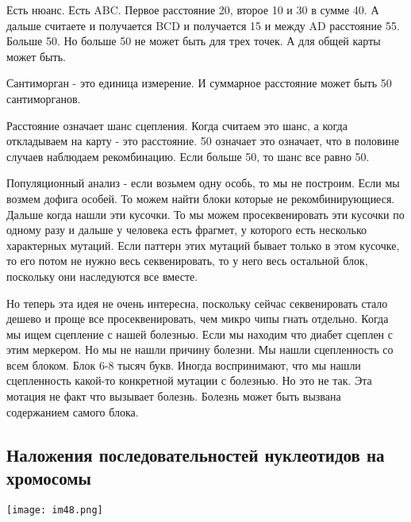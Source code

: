 \begin{description}
Есть нюанс. Есть ABC. Первое расстояние 20, второе 10 и 30 в сумме 40. А дальше считаете и 
получается BCD и получается 15 и между AD расстояние 55. Больше 50. Но больше 50 не может 
быть для трех точек. А для общей карты может быть. 

Сантиморган - это единица измерение. И суммарное расстояние может быть 50 сантиморганов. 

Расстояние означает шанс сцепления. Когда считаем это шанс, а когда откладываем на карту - это 
расстояние. 50 означает это означает, что в половине случаев наблюдаем рекомбинацию. Если больше 50, то 
шанс все равно 50. 

Популяционный анализ - если возьмем одну особь, то мы не построим. Если мы возмем дофига особей. 
То можем найти блоки которые не рекомбинирующиеся. Дальше когда нашли эти кусочки. То 
мы можем просеквенировать эти кусочки по одному разу и дальше у человека есть 
фрагмет, у которого есть несколько характерных мутаций. Если паттерн этих 
мутаций бывает только в этом кусочке, то его потом не нужно весь секвенировать, 
то у него весь остальной блок, поскольку они наследуются все вместе. 

Но теперь эта идея не очень интересна, поскольку сейчас секвенировать стало дешево и 
проще все просеквенировать, чем микро чипы гнать отдельно. Когда мы ищем сцепление с нашей болезнью. 
Если мы находим что диабет сцеплен с этим меркером. Но мы  не нашли причину болезни. 
Мы нашли сцепленность со всем блоком. Блок 6-8 тысяч букв. Иногда воспринимают, что 
мы нашли сцепленность какой-то конкретной мутации с болезнью. Но это не так. 
Эта мотация не факт что вызывает болезнь. Болезнь может быть вызвана содержанием самого блока. 

\end{description}

\subsection{Наложения последовательностей нуклеотидов на хромосомы}

\texttt{[image: im48.png]}

